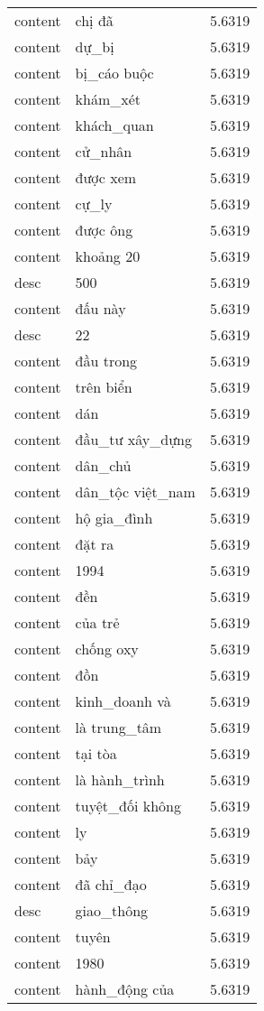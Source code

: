 \documentclass{article}
\begin{document}
\begin{tabular}{lll}
content & chị đã & 5.6319\\
content & dự\_bị & 5.6319\\
content & bị\_cáo buộc & 5.6319\\
content & khám\_xét & 5.6319\\
content & khách\_quan & 5.6319\\
content & cử\_nhân & 5.6319\\
content & được xem & 5.6319\\
content & cự\_ly & 5.6319\\
content & được ông & 5.6319\\
content & khoảng 20 & 5.6319\\
desc & 500 & 5.6319\\
content & đấu này & 5.6319\\
desc & 22 & 5.6319\\
content & đầu trong & 5.6319\\
content & trên biển & 5.6319\\
content & dán & 5.6319\\
content & đầu\_tư xây\_dựng & 5.6319\\
content & dân\_chủ & 5.6319\\
content & dân\_tộc việt\_nam & 5.6319\\
content & hộ gia\_đình & 5.6319\\
content & đặt ra & 5.6319\\
content & 1994 & 5.6319\\
content & đền & 5.6319\\
content & của trẻ & 5.6319\\
content & chống oxy & 5.6319\\
content & đồn & 5.6319\\
content & kinh\_doanh và & 5.6319\\
content & là trung\_tâm & 5.6319\\
content & tại tòa & 5.6319\\
content & là hành\_trình & 5.6319\\
content & tuyệt\_đối không & 5.6319\\
content & ly & 5.6319\\
content & bảy & 5.6319\\
content & đã chỉ\_đạo & 5.6319\\
desc & giao\_thông & 5.6319\\
content & tuyên & 5.6319\\
content & 1980 & 5.6319\\
content & hành\_động của & 5.6319\\

\end{tabular}
\end{document}
